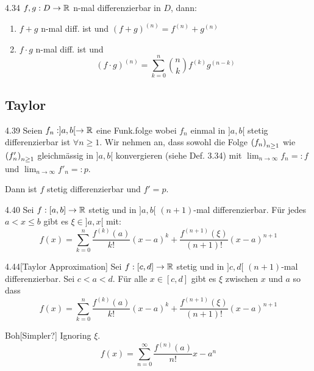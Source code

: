 \begin{satz}{4.34}
    $f,g: D \to \mathbb{R}$ n-mal differenzierbar in $D$, dann:
    \begin{enumerate}
        \item $f + g$ n-mal diff. ist und $(f + g)^{(n)} = f^{(n)} + g^{(n)}$
        \item $f \cdot g$ n-mal diff. ist und
              \[ (f \cdot g)^{(n)} = \sum_{k=0}^n \binom{n}{k} f^{(k)}g^{(n - k)} \]
    \end{enumerate}
\end{satz}

\subsection{Taylor}

\begin{satz}{4.39}
    Seien $f_n: ]a, b[ \to \mathbb{R}$ eine Funk.folge wobei $f_n$ einmal in $]a,b[$ stetig differenzierbar ist $\forall n \ge 1$.
    Wir nehmen an, dass sowohl die Folge $\left( f_n \right)_{n \ge 1}$ wie $\left( f'_n \right)_{n \ge 1}$ gleichmässig in $]a, b[$ konvergieren
    (siehe Def. 3.34) mit $\lim_{n \to \infty} f_n =: f$ und $\lim_{n \to \infty} f'_n =: p$.

    Dann ist $f$ stetig differenzierbar und $f' = p$.
\end{satz}

\begin{satz}{4.40}
    Sei $f: [a,b] \to \mathbb{R}$ stetig und in $]a, b[$ $(n+1)$-mal differenzierbar. Für jedes
                $a < x \le b$ gibt es $\xi \in ]a, x[$ mit:
    \[ f(x) = \sum_{k = 0}^n \frac{f^{(k)}(a)}{k!} (x - a)^k + \frac{f^{(n + 1)}(\xi)}{(n + 1)!}(x - a)^{n + 1}\]
\end{satz}

\begin{korollar}{4.44}[Taylor Approximation]
    Sei $f: [c, d] \to \mathbb{R}$ stetig und in $]c, d[$ $(n+1)$-mal differenzierbar. Sei $c < a < d$. Für
    alle $x \in [c, d]$ gibt es $\xi$ zwischen $x$ und $a$ so dass
    \[ f(x) = \sum_{k = 0}^n \frac{ f^{(k)}(a) }{ k! } (x - a)^k + \frac{f^{(n+1)}(\xi)}{(n+1)!}(x - a)^{n + 1}\]
\end{korollar}

\begin{satz}{Boh}[Simpler?]
    Ignoring $\xi$.
    \[ f(x) = \sum_{n = 0}^\infty \frac{f^{(n)}(a)}{n!}{x - a}^n \]
\end{satz}
